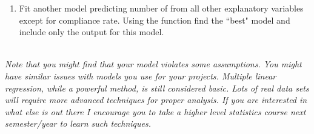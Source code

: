 \documentclass[11pt]{article}
\begin{document}
\begin{enumerate}
%
%
%
%

\item Fit another model predicting number of  from all other explanatory variables except for compliance rate. Using the  function find the ``best" model and include only the output for this model.


%
%
%

\end{enumerate}

$\:$ \\

\textit{Note that you might find that your model violates some assumptions. You might  have similar issues with models you use for your projects. Multiple linear regression, while a powerful method, is still considered basic. Lots of real data sets will require more advanced techniques for proper analysis. If you are interested in what else is out there I encourage you to take a higher level statistics course next semester/year to learn such techniques.}
\end{document}

